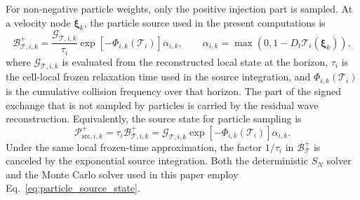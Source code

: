 \documentclass[preprint,12pt]{elsarticle}
\begin{document}
For non-negative particle weights, only the positive injection part is sampled. At a velocity node $\boldsymbol{\xi}_k$, the particle source used in the present computations is
\begin{equation}\label{eq:positive_particle_source}
    \mathcal B_{\mathcal{T},i,k}^{+}
    =
    \frac{\mathcal{G}_{\mathcal{T},i,k}}{\tau_i}
    \exp\!\left[-\Phi_{i,k}(\mathcal{T}_i)\right]
    \alpha_{i,k},
    \qquad
    \alpha_{i,k}
    =
    \max\left(0,1-D_t \mathcal{T}_i(\boldsymbol{\xi}_k)\right),
\end{equation}
where $\mathcal{G}_{\mathcal{T},i,k}$ is evaluated from the reconstructed local state at the horizon, $\tau_i$ is the cell-local frozen relaxation time used in the source integration, and $\Phi_{i,k}(\mathcal{T}_i)$ is the cumulative collision frequency over that horizon. The part of the signed exchange that is not sampled by particles is carried by the residual wave reconstruction. Equivalently, the source state for particle sampling is
\begin{equation}\label{eq:particle_source_state}
    \mathcal{P}_{\mathrm{src},i,k}^{+}
    =
    \tau_i\mathcal B_{\mathcal{T},i,k}^{+}
    =
    \mathcal{G}_{\mathcal{T},i,k}
    \exp\!\left[-\Phi_{i,k}(\mathcal{T}_i)\right]
    \alpha_{i,k}.
\end{equation}
Under the same local frozen-time approximation, the factor $1/\tau_i$ in $\mathcal B_{\mathcal{T}}^{+}$ is canceled by the exponential source integration. Both the deterministic $S_N$ solver and the Monte Carlo solver used in this paper employ Eq.~\eqref{eq:particle_source_state}.
\end{document}
